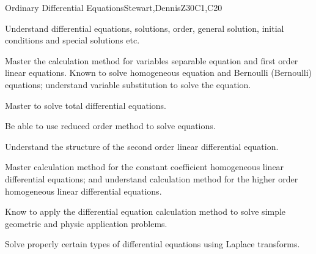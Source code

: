\begin{syllabus}
\begin{unit}{Ordinary Differential Equations}{}{Stewart,DennisZ}{30}{C1,C20}
   \begin{learningoutcomes}
    \item Understand differential equations, solutions, order, general solution, initial conditions and special solutions etc.
    \item Master the calculation method for variables separable equation and first order linear equations. Known to solve homogeneous equation and Bernoulli (Bernoulli) equations; understand variable substitution to solve the equation.
    \item Master to solve total differential equations.
    \item Be able to use reduced order method to solve equations.
    \item Understand the structure of the second order linear differential equation.
    \item Master calculation method for the constant coefficient homogeneous linear differential equations; and understand calculation method for the higher order homogeneous linear differential equations.
    \item Know to apply the differential equation calculation method to solve simple geometric and physic application problems.
    \item Solve properly certain types of differential equations using Laplace transforms.

   \end{learningoutcomes}
\end{unit}

\begin{coursebibliography}
\end{coursebibliography}

\end{syllabus}
